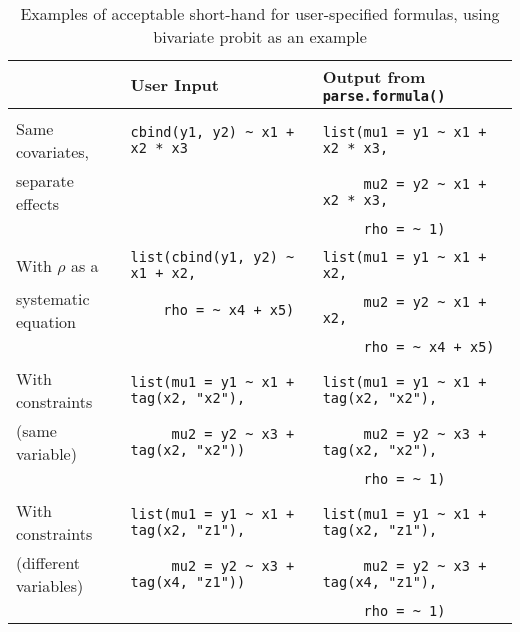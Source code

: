 \clearpage
\begin{landscape}
\begin{table}[h!]
\caption{Examples of acceptable short-hand for user-specified
formulas, using bivariate probit as an example}
\label{good.formulas}
\begin{center}
\begin{tabular}{lll}
\\
 & User Input    & Output from {\tt parse.formula()} \\
\hline
\\
Same covariates, & \verb|cbind(y1, y2) ~ x1 + x2 * x3|  & \verb|list(mu1 = y1 ~ x1 + x2 * x3,|\\
separate effects & & \verb|     mu2 = y2 ~ x1 + x2 * x3,| \\
& &                  \verb|     rho = ~ 1)| \\
\\
With $\rho$ as a & \verb|list(cbind(y1, y2) ~ x1 + x2,| &
\verb|list(mu1 = y1 ~ x1 + x2,|\\
systematic equation & \verb|    rho = ~ x4 + x5)| & \verb|     mu2 = y2 ~ x1 + x2,|\\
& & \verb|     rho = ~ x4 + x5)| \\
\\
With constraints & \verb|list(mu1 = y1 ~ x1 + tag(x2, "x2"),| &
\verb|list(mu1 = y1 ~ x1 + tag(x2, "x2"),| \\ 
(same variable)  & \verb|     mu2 = y2 ~ x3 + tag(x2, "x2"))| &
\verb|     mu2 = y2 ~ x3 + tag(x2, "x2"),|\\
& & \verb|     rho = ~ 1)|\\
\\
With constraints & \verb|list(mu1 = y1 ~ x1 + tag(x2, "z1"),| &
\verb|list(mu1 = y1 ~ x1 + tag(x2, "z1"),| \\ 
(different variables)  & \verb|     mu2 = y2 ~ x3 + tag(x4, "z1"))| &
\verb|     mu2 = y2 ~ x3 + tag(x4, "z1"),|\\
& & \verb|     rho = ~ 1)|\\
\end{tabular}
\end{center}
\end{table}
\end{landscape}
















